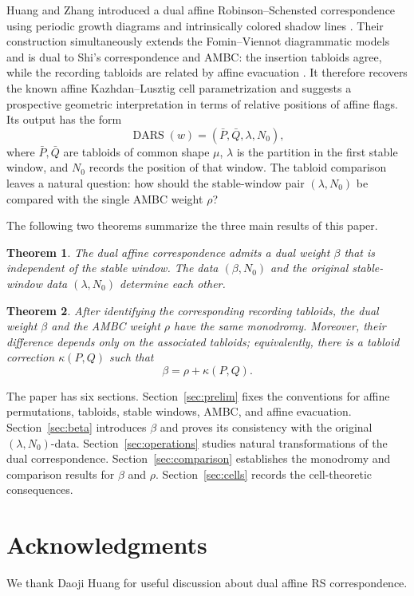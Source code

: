 \documentclass[11pt]{article}
\newtheorem{theorem}{Theorem}[section]
\theoremstyle{definition}
\theoremstyle{remark}
\newcommand{\RSd}{\operatorname{DARS}}
\begin{document}
Huang and Zhang introduced a dual affine Robinson--Schensted correspondence using
periodic growth diagrams and intrinsically colored shadow lines \cite{HZ26}.  Their
construction simultaneously extends the Fomin--Viennot diagrammatic models and is dual
to Shi's correspondence and AMBC: the insertion tabloids agree, while the recording
tabloids are related by affine evacuation \cite{CFKLY22}.  It therefore recovers the
known affine Kazhdan--Lusztig cell parametrization and suggests a prospective geometric
interpretation in terms of relative positions of affine flags.  Its output has the form
\[
                 \RSd(w)=(\bar P,\bar Q,\lambda,N_0),
\]
where \(\bar P,\bar Q\) are tabloids of common shape \(\mu\), \(\lambda\) is the
partition in the first stable window, and \(N_0\) records the position of that window.
The tabloid comparison leaves a natural question: how should the stable-window pair
\((\lambda,N_0)\) be compared with the single AMBC weight \(\rho\)?

The following two theorems summarize the three main results of this paper.

\begin{theorem}\label{thm:intro-beta}
The dual affine correspondence admits a dual weight \(\beta\) that is independent of
the stable window.  The data \((\beta,N_0)\) and the original
stable-window data \((\lambda,N_0)\) determine each other.
\end{theorem}

\begin{theorem}\label{thm:intro-comparison}
After identifying the corresponding recording tabloids, the dual weight \(\beta\) and
the AMBC weight \(\rho\) have the same monodromy.  Moreover, their difference depends
only on the associated tabloids; equivalently, there is a tabloid correction
\(\kappa(P,Q)\) such that
\[
                         \beta=\rho+\kappa(P,Q).
\]
\end{theorem}

The paper has six sections.  Section~\ref{sec:prelim} fixes the conventions for affine
permutations, tabloids, stable windows, AMBC, and affine evacuation.
Section~\ref{sec:beta} introduces \(\beta\) and proves its consistency with the original
\((\lambda,N_0)\)-data.  Section~\ref{sec:operations} studies natural transformations of
the dual correspondence.  Section~\ref{sec:comparison} establishes the monodromy and
comparison results for \(\beta\) and \(\rho\).  Section~\ref{sec:cells} records the
cell-theoretic consequences.

\section*{Acknowledgments}
We thank Daoji Huang for useful discussion about dual affine RS correspondence.
\end{document}
